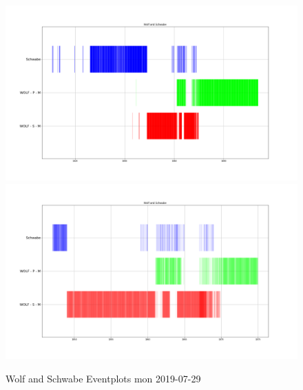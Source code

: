 \documentclass[12pt]{article}
\begin{document}
\begin{figure}[H]
    \includegraphics[width=0.5\linewidth]{wolf_and_schwabe_eventplot.png}
    \includegraphics[width=0.5\linewidth]{wolf_and_schwabe_eventplot_1847_1875.png}
    \caption{Wolf and Schwabe Eventplots mon 2019-07-29}
    \label{fig:wolf and schwabe eventplots}
\end{figure}
\end{document}
